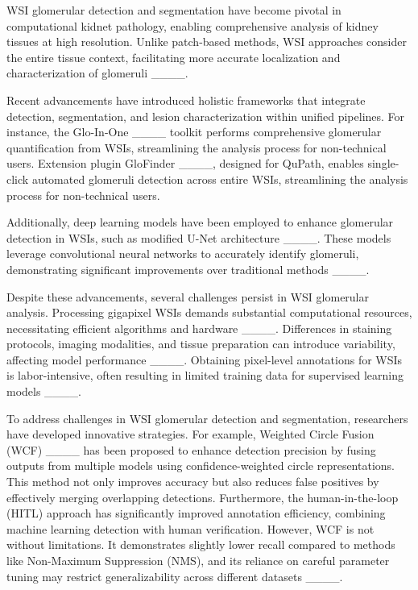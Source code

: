 WSI glomerular detection and segmentation have become pivotal in computational kidnet pathology, enabling comprehensive analysis of kidney tissues at high resolution. Unlike patch-based methods, WSI approaches consider the entire tissue context, facilitating more accurate localization and characterization of glomeruli ____. 

Recent advancements have introduced holistic frameworks that integrate detection, segmentation, and lesion characterization within unified pipelines. For instance, the Glo-In-One ____ toolkit performs comprehensive glomerular quantification from WSIs, streamlining the analysis process for non-technical users. Extension plugin GloFinder ____, designed for QuPath, enables single-click automated glomeruli detection across entire WSIs, streamlining the analysis process for non-technical users.

Additionally, deep learning models have been employed to enhance glomerular detection in WSIs, such as modified U-Net architecture ____. These models leverage convolutional neural networks to accurately identify glomeruli, demonstrating significant improvements over traditional methods ____. 

Despite these advancements, several challenges persist in WSI glomerular analysis. Processing gigapixel WSIs demands substantial computational resources, necessitating efficient algorithms and hardware ____. Differences in staining protocols, imaging modalities, and tissue preparation can introduce variability, affecting model performance ____. Obtaining pixel-level annotations for WSIs is labor-intensive, often resulting in limited training data for supervised learning models ____. 

To address challenges in WSI glomerular detection and segmentation, researchers have developed innovative strategies. For example, Weighted Circle Fusion (WCF) ____ has been proposed to enhance detection precision by fusing outputs from multiple models using confidence-weighted circle representations. This method not only improves accuracy but also reduces false positives by effectively merging overlapping detections. Furthermore, the human-in-the-loop (HITL) approach has significantly improved annotation efficiency, combining machine learning detection with human verification. However, WCF is not without limitations. It demonstrates slightly lower recall compared to methods like Non-Maximum Suppression (NMS), and its reliance on careful parameter tuning may restrict generalizability across different datasets ____.